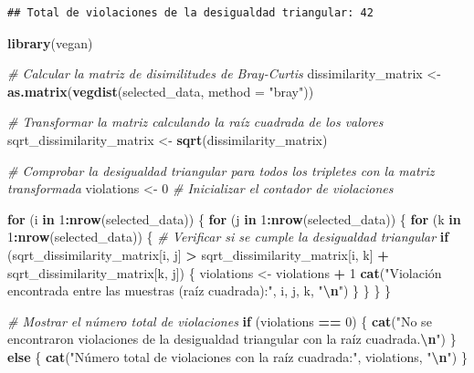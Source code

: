 \documentclass[
]{article}
\newenvironment{Shaded}{\begin{snugshade}}{\end{snugshade}}
\newcommand{\AttributeTok}[1]{\textcolor[rgb]{0.13,0.29,0.53}{#1}}
\newcommand{\CommentTok}[1]{\textcolor[rgb]{0.56,0.35,0.01}{\textit{#1}}}
\newcommand{\ControlFlowTok}[1]{\textcolor[rgb]{0.13,0.29,0.53}{\textbf{#1}}}
\newcommand{\DecValTok}[1]{\textcolor[rgb]{0.00,0.00,0.81}{#1}}
\newcommand{\FunctionTok}[1]{\textcolor[rgb]{0.13,0.29,0.53}{\textbf{#1}}}
\newcommand{\NormalTok}[1]{#1}
\newcommand{\OtherTok}[1]{\textcolor[rgb]{0.56,0.35,0.01}{#1}}
\newcommand{\SpecialCharTok}[1]{\textcolor[rgb]{0.81,0.36,0.00}{\textbf{#1}}}
\newcommand{\StringTok}[1]{\textcolor[rgb]{0.31,0.60,0.02}{#1}}
\begin{document}
\begin{verbatim}
## Total de violaciones de la desigualdad triangular: 42
\end{verbatim}

\begin{Shaded}
\begin{Highlighting}[]
\FunctionTok{library}\NormalTok{(vegan)}

\CommentTok{\# Calcular la matriz de disimilitudes de Bray{-}Curtis}
\NormalTok{dissimilarity\_matrix }\OtherTok{\textless{}{-}} \FunctionTok{as.matrix}\NormalTok{(}\FunctionTok{vegdist}\NormalTok{(selected\_data, }\AttributeTok{method =} \StringTok{"bray"}\NormalTok{))}

\CommentTok{\# Transformar la matriz calculando la raíz cuadrada de los valores}
\NormalTok{sqrt\_dissimilarity\_matrix }\OtherTok{\textless{}{-}} \FunctionTok{sqrt}\NormalTok{(dissimilarity\_matrix)}

\CommentTok{\# Comprobar la desigualdad triangular para todos los tripletes con la matriz transformada}
\NormalTok{violations }\OtherTok{\textless{}{-}} \DecValTok{0}  \CommentTok{\# Inicializar el contador de violaciones}

\ControlFlowTok{for}\NormalTok{ (i }\ControlFlowTok{in} \DecValTok{1}\SpecialCharTok{:}\FunctionTok{nrow}\NormalTok{(selected\_data)) \{}
  \ControlFlowTok{for}\NormalTok{ (j }\ControlFlowTok{in} \DecValTok{1}\SpecialCharTok{:}\FunctionTok{nrow}\NormalTok{(selected\_data)) \{}
    \ControlFlowTok{for}\NormalTok{ (k }\ControlFlowTok{in} \DecValTok{1}\SpecialCharTok{:}\FunctionTok{nrow}\NormalTok{(selected\_data)) \{}
      \CommentTok{\# Verificar si se cumple la desigualdad triangular}
      \ControlFlowTok{if}\NormalTok{ (sqrt\_dissimilarity\_matrix[i, j] }\SpecialCharTok{\textgreater{}}\NormalTok{ sqrt\_dissimilarity\_matrix[i, k] }\SpecialCharTok{+}\NormalTok{ sqrt\_dissimilarity\_matrix[k, j]) \{}
\NormalTok{        violations }\OtherTok{\textless{}{-}}\NormalTok{ violations }\SpecialCharTok{+} \DecValTok{1}
        \FunctionTok{cat}\NormalTok{(}\StringTok{"Violación encontrada entre las muestras (raíz cuadrada):"}\NormalTok{, i, j, k, }\StringTok{"}\SpecialCharTok{\textbackslash{}n}\StringTok{"}\NormalTok{)}
\NormalTok{      \}}
\NormalTok{    \}}
\NormalTok{  \}}
\NormalTok{\}}

\CommentTok{\# Mostrar el número total de violaciones}
\ControlFlowTok{if}\NormalTok{ (violations }\SpecialCharTok{==} \DecValTok{0}\NormalTok{) \{}
  \FunctionTok{cat}\NormalTok{(}\StringTok{"No se encontraron violaciones de la desigualdad triangular con la raíz cuadrada.}\SpecialCharTok{\textbackslash{}n}\StringTok{"}\NormalTok{)}
\NormalTok{\} }\ControlFlowTok{else}\NormalTok{ \{}
  \FunctionTok{cat}\NormalTok{(}\StringTok{"Número total de violaciones con la raíz cuadrada:"}\NormalTok{, violations, }\StringTok{"}\SpecialCharTok{\textbackslash{}n}\StringTok{"}\NormalTok{)}
\NormalTok{\}}
\end{Highlighting}
\end{Shaded}
\end{document}
